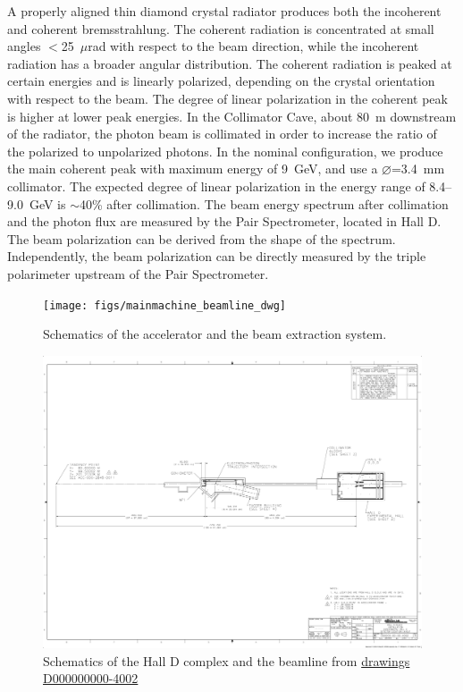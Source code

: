 A properly aligned thin diamond crystal radiator produces both the
incoherent and coherent bremsstrahlung. The coherent radiation is
concentrated at small angles $<$25~$\mu$rad with respect to the beam
direction, while the incoherent radiation has a broader angular
distribution.  The coherent radiation is peaked at certain energies
and is linearly polarized, depending on the crystal orientation with
respect to the beam. The degree of linear polarization in the coherent
peak is higher at lower peak energies. In the Collimator Cave, about
80~m downstream of the radiator, the photon beam is collimated in
order to increase the ratio of the polarized to unpolarized photons.  In
the nominal \GX{} configuration, we produce the main coherent peak
with maximum energy of 9~GeV, and use a $\diameter$=3.4~mm collimator.
The expected degree of linear polarization in the energy range of
8.4--9.0~GeV is $\sim$40\% after collimation. The beam energy spectrum
after collimation and the photon flux are measured by the Pair
Spectrometer, located in Hall D. The beam polarization can be derived
from the shape of the spectrum. Independently, the beam polarization
can be directly measured by the triple polarimeter upstream of the
Pair Spectrometer.
 
\begin{figure}[t]
\begin{center}
   \texttt{[image: figs/mainmachine\_beamline\_dwg]}
\end{center}
\caption{Schematics of the accelerator and the beam extraction system.
        }
\label{fig:beam:cebaf-dwg} 
\end{figure}
\begin{figure}[h]
\begin{center}
   \includegraphics[page=1,viewport=1001 991 3020 1700,clip,angle=0,width=0.98\linewidth]{figures/D000000000-4002_RevB}
\end{center}
\caption{Schematics of the Hall D complex and the beamline 
         from \href{https://misportal.jlab.org/jlabDocs/document.seam?id=80930}{drawings D000000000-4002}
        }
\label{fig:beam:halld-tot} 
\end{figure}

